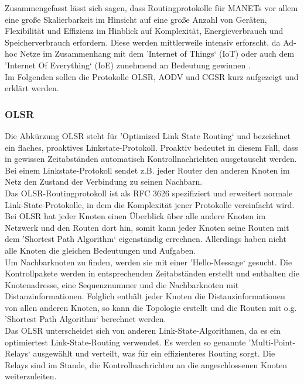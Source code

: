 Zusammengefasst lässt sich sagen, dass Routingprotokolle für MANETs vor allem eine große Skalierbarkeit im Hinsicht auf eine große Anzahl von Geräten, Flexibilität und Effizienz im Hinblick auf Komplexität, Energieverbrauch und Speicherverbrauch erfordern. Diese werden mittlerweile intensiv erforscht, da Ad-hoc Netze im Zusammenhang mit dem 'Internet of Things‘ (IoT) oder auch dem 'Internet Of Everything‘ (IoE) zunehmend an Bedeutung gewinnen \cite{d:timm}. \\

Im Folgenden sollen die Protokolle OLSR, AODV und CGSR kurz aufgezeigt und erklärt werden.

\subsubsection{OLSR}\label{ss:OLSR}

Die Abkürzung OLSR steht für 'Optimized Link State Routing‘ und bezeichnet ein flaches, proaktives Linkstate-Protokoll. Proaktiv bedeutet in diesem Fall, dass in gewissen Zeitabständen automatisch Kontrollnachrichten ausgetauscht werden. Bei einem Linkstate-Protokoll sendet z.B. jeder Router den anderen Knoten im Netz den Zustand der Verbindung zu seinen Nachbarn. \\
Das OLSR-Routingprotokoll ist als \ac{RFC} 3626 spezifiziert und erweitert normale Link-State-Protokolle, in dem die Komplexität jener Protokolle vereinfacht wird. \\
Bei OLSR hat jeder Knoten einen Überblick über alle andere Knoten im Netzwerk und den Routen dort hin, somit kann jeder Knoten seine Routen mit dem 'Shortest Path Algorithm‘ eigenständig errechnen. Allerdings haben nicht alle Knoten die gleichen Bedeutungen und Aufgaben.\\
Um Nachbarknoten zu finden, werden sie mit einer 'Hello-Message‘ gesucht. Die Kontrollpakete werden in entsprechenden Zeitabständen erstellt und enthalten die Knotenadresse, eine Sequenznummer und die Nachbarknoten mit Distanzinformationen. Folglich enthält jeder Knoten die Distanzinformationen von allen anderen Knoten, so kann die Topologie erstellt und die Routen mit o.g. 'Shortest Path Algorithm‘ berechnet werden. \\

Das OLSR unterscheidet sich von anderen Link-State-Algorithmen, da es ein optimiertest Link-State-Routing verwendet. Es werden so genannte 'Multi-Point-Relays‘ ausgewählt und verteilt, was für ein effizienteres Routing sorgt. Die Relays sind im Stande, die Kontrollnachrichten an die angeschlossenen Knoten weiterzuleiten.

